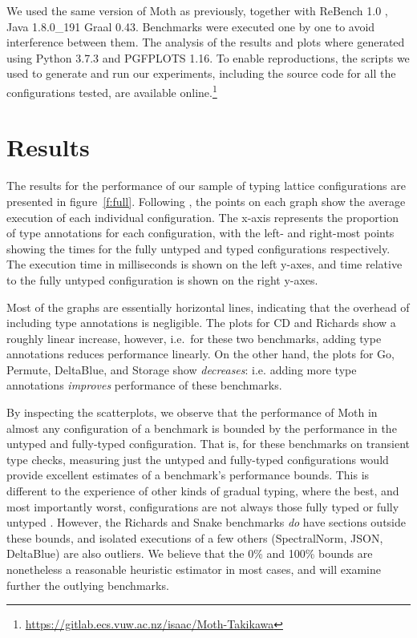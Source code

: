 \documentclass[sigplan,10pt,review,screen]{acmart}\settopmatter{printfolios=true}
\begin{document}
We used the same version of Moth as previously, together with ReBench 1.0 \citep{ReBench:2018}, Java 1.8.0\_191 Graal 0.43. Benchmarks were executed one by one to avoid interference between them. The analysis of the results and plots where generated using Python 3.7.3 and PGFPLOTS 1.16. To enable reproductions, the scripts we used to generate and run our experiments, including the source code for all the configurations tested, are available online.\footnote{\url{https://gitlab.ecs.vuw.ac.nz/isaac/Moth-Takikawa}}

\section{Results}
\label{s-overall}

\begin{figure*}
	
	\caption{Graphs of (at most) 102 configurations in the typing lattices for each benchmark. Time is measured as the mean of the 351\textsuperscript{st} to the 1,000\textsuperscript{th} benchmark iteration under a single invocation of Moth (lower is better).}
	\label{f:full}
\end{figure*}
The results for the performance of our sample of typing lattice configurations are presented in figure~\ref{f:full}. Following \cite{vitousek-transient-arXive-2019}, the points on each graph show the average execution of each individual configuration. The x-axis represents the proportion of type annotations for each configuration, with the left- and right-most points showing the times for the fully untyped and typed configurations respectively. The execution time in milliseconds is shown on the left y-axes, and time relative to the fully untyped configuration is shown on the right y-axes.

Most of the graphs are essentially horizontal lines, indicating that the overhead of including type annotations is negligible. The plots for CD and Richards show a roughly linear increase, however, i.e.\ for these two benchmarks, adding type annotations reduces performance linearly. On the other hand, the plots for Go, Permute, DeltaBlue, and Storage show \emph{decreases}: i.e. adding more type annotations \emph{improves} performance of these benchmarks.

By inspecting the scatterplots, we observe that the performance of
Moth in almost any configuration of a benchmark is bounded by
the performance in the untyped and fully-typed configuration.
That is, for these benchmarks on transient type checks,
measuring just the untyped and fully-typed configurations
would provide excellent estimates of a benchmark's
performance bounds.  This is different to the experience
of other kinds of gradual typing, where the best, and most
importantly worst, configurations are not always those
fully typed or fully untyped \cite{greenam-takikiaw-JFP}.
%
However, the Richards and Snake benchmarks \textit{do} have
sections outside these bounds, and isolated executions of
a few others (SpectralNorm, JSON, DeltaBlue) are also outliers.
%
We believe that the 0\% and 100\% bounds are nonetheless a
reasonable heuristic estimator in most cases, and will
examine further the outlying benchmarks.
\end{document}
